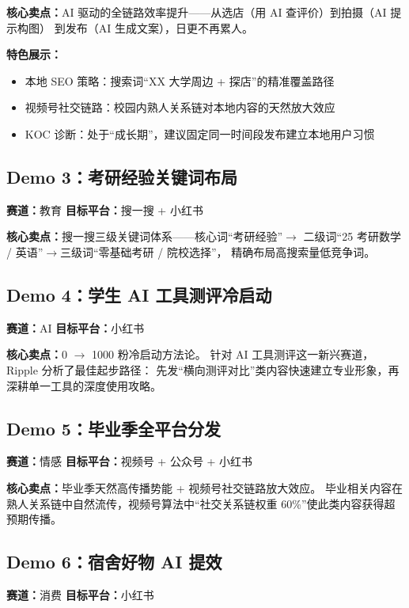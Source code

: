 \documentclass[12pt,a4paper]{ctexart}
\begin{document}
\textbf{核心卖点：}AI 驱动的全链路效率提升——从选店（用 AI 查评价）到拍摄（AI 提示构图）
到发布（AI 生成文案），日更不再累人。

\textbf{特色展示：}
\begin{itemize}
  \item 本地 SEO 策略：搜索词``XX 大学周边 + 探店''的精准覆盖路径
  \item 视频号社交链路：校园内熟人关系链对本地内容的天然放大效应
  \item KOC 诊断：处于``成长期''，建议固定同一时间段发布建立本地用户习惯
\end{itemize}

\subsection{Demo 3：考研经验关键词布局}

\textbf{赛道：}教育 \quad \textbf{目标平台：}搜一搜 + 小红书

\textbf{核心卖点：}搜一搜三级关键词体系——核心词``考研经验''$\rightarrow$
二级词``25 考研数学 / 英语''$\rightarrow$三级词``零基础考研 / 院校选择''，
精确布局高搜索量低竞争词。

\subsection{Demo 4：学生 AI 工具测评冷启动}

\textbf{赛道：}AI \quad \textbf{目标平台：}小红书

\textbf{核心卖点：}0 $\rightarrow$ 1000 粉冷启动方法论。
针对 AI 工具测评这一新兴赛道，Ripple 分析了最佳起步路径：
先发``横向测评对比''类内容快速建立专业形象，再深耕单一工具的深度使用攻略。

\subsection{Demo 5：毕业季全平台分发}

\textbf{赛道：}情感 \quad \textbf{目标平台：}视频号 + 公众号 + 小红书

\textbf{核心卖点：}毕业季天然高传播势能 + 视频号社交链路放大效应。
毕业相关内容在熟人关系链中自然流传，视频号算法中``社交关系链权重 60\%''使此类内容获得超预期传播。

\subsection{Demo 6：宿舍好物 AI 提效}

\textbf{赛道：}消费 \quad \textbf{目标平台：}小红书
\end{document}
